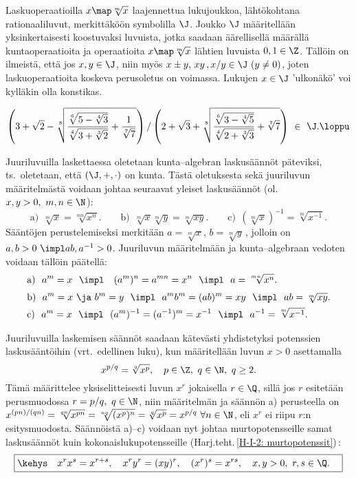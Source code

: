 Laskuoperaatioilla $x \map \sqrt[m]{x}$ laajennettua lukujoukkoa, lähtökohtana rationaaliluvut,
merkittäköön symbolilla $\J$. Joukko $\J$ määritellään yksinkertaisesti koostuvaksi luvuista,
jotka saadaan äärellisellä määrällä kuntaoperaatioita ja operaatioita $x \map \sqrt[m]{x}$
lähtien luvuista $0,1\in\Z$. Tällöin on ilmeistä, että jos $x,y\in\J$, niin myös
$x \pm y,\,xy\,,x/y\in\J\ (y \neq 0)$, joten laskuoperaatioita koskeva perusoletus on voimassa.
Lukujen $x\in\J$ 'ulkonäkö' voi kylläkin olla konstikas.
\begin{Exa}
\[
\left(3+\sqrt{2}
-\sqrt[8]{\frac{\sqrt[6]{5-\sqrt[4]{3}}}{\sqrt[4]{3+\sqrt[3]{2}}}+\frac{1}{\sqrt[7]{7}}}\right)/
\left(2+\sqrt{3}
+\sqrt[8]{\frac{\sqrt[6]{3-\sqrt[4]{5}}}{\sqrt[4]{2+\sqrt[3]{3}}}+\sqrt[7]{7}}\right)
                                                        \ \in\ \J. \loppu
\]
\end{Exa}
Juuriluvuilla laskettaessa oletetaan kunta--algebran laskusäännöt päteviksi, ts.\ oletetaan,
että $(\J,+,\cdot)$ on kunta. Tästä oletuksesta sekä juuriluvun määritelmästä voidaan johtaa
seuraavat yleiset laskusäännöt (ol.\ $x,y>0,\ m,n\in\N$):
\[
\text{a)}\ \ \sqrt[m]{x} = \sqrt[mn]{x^n}. \qquad
\text{b)}\ \ \sqrt[m]{x}\sqrt[m]{y} = \sqrt[m]{xy}. \qquad
\text{c)}\ \ \left(\sqrt[m]{x}\right)^{-1} = \sqrt[m]{x^{-1}}.
\]
Sääntöjen perustelemiseksi merkitään $a=\sqrt[m]{x}$, $b=\sqrt[m]{y}\,$, jolloin on
$a,b>0\ \impl ab,a^{-1}>0$. Juuriluvun määritelmään ja kunta--algebraan vedoten voidaan
tällöin päätellä:
\begin{align*}
&\text{a)}\ \ a^m=x\ \ \impl\ \ \ (a^m)^n = a^{mn} = x^n\ \  \impl\ \ a=\sqrt[mn]{x^n}. \\[1mm]
&\text{b)}\ \ a^m=x\ \ja\ b^m=y\ \ \impl\ \  a^mb^m =(ab)^m = xy\ \ \impl\ \ ab=\sqrt[m]{xy}. \\
&\text{c)}\ \ a^m=x\ \ \impl\ \ (a^m)^{-1} = (a^{-1})^m=x^{-1}\ \ \impl\ \ a^{-1}=\sqrt[m]{x^{-1}}.
\end{align*}

Juuriluvuilla laskemisen säännöt saadaan kätevästi yhdistetyksi potenssien laskusääntöihin
%
(vrt.\ edellinen luku), kun määritellään luvun $x>0$  asettamalla
\[
x^{p/q} = \sqrt[q]{x^p}, \quad p\in\Z,\ q\in\N,\ q \ge 2.
\]
Tämä määrittelee yksiselitteisesti luvun $x^r$ jokaisella $r\in\Q$, sillä jos $r$ esitetään
perusmuodossa $r=p/q,\ q\in\N$, niin määritelmän ja säännön a) perusteella on
$x^{(pn)/(qn)}=\sqrt[qn]{x^{pn}}=\sqrt[nq]{(x^p)^n}=\sqrt[q]{x^p}=x^{p/q}\ \forall n\in\N$, eli
$x^r$ ei riipu $r$:n esitysmuodosta. Säännöistä a)--c) voidaan nyt johtaa murtopotensseille
samat laskusäännöt kuin kokonaislukupotensseille (Harj.teht.\,\ref{H-I-2: murtopotenssit})\,:
\[
\boxed{\kehys \quad x^rx^s=x^{r+s}, \quad x^ry^r=(xy)^r, \quad (x^r)^s=x^{rs}, 
                                                         \quad x,y>0,\ r,s\in\Q. \quad} 
\]

